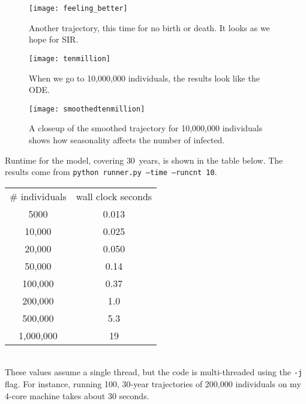 \documentclass{article}
\begin{document}
\begin{figure}
\centerline{\texttt{[image: feeling\_better]}}
\caption{Another trajectory, this time for no birth or death.
It looks as we hope for SIR.\label{fig:longexact}}
\end{figure}

\begin{figure}
\centerline{\texttt{[image: tenmillion]}}
\caption{When we go to 10,000,000 individuals, the results look like the
ODE.}
\end{figure}


\begin{figure}
\centerline{\texttt{[image: smoothedtenmillion]}}
\caption{A closeup of the smoothed trajectory for 10,000,000 individuals
shows how seasonality affects the number of infected.}
\end{figure}

Runtime for the model, covering $30$~years, is shown in the table below.
The results come from \texttt{python runner.py --time --runcnt 10}. \\
\begin{tabular}{cc}
\# individuals & wall clock seconds \\
5000 & 0.013 \\
10,000 & 0.025 \\
20,000 & 0.050 \\
50,000 & 0.14 \\
100,000 & 0.37 \\
200,000 & 1.0 \\
500,000 & 5.3 \\
1,000,000 & 19
\end{tabular} \\
These values assume a single thread, but the code is multi-threaded
using the \texttt{-j} flag. For instance, running 100, 30-year trajectories
of 200,000 individuals on my 4-core machine takes about 30 seconds.
\end{document}
